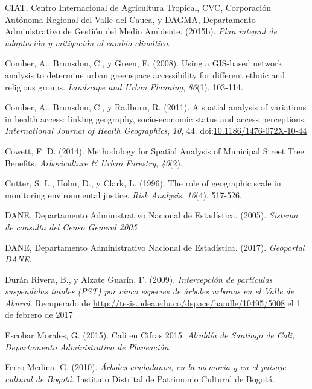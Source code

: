 \documentclass[12pt,a4paper,oneside, openany]{book}
\theoremstyle{definition}
\theoremstyle{definition}
\theoremstyle{definition}
\theoremstyle{remark}
\begin{document}
\hypertarget{ref-ciat_plan_2015}{}
CIAT, Centro Internacional de Agricultura Tropical, CVC, Corporación
Autónoma Regional del Valle del Cauca, y DAGMA, Departamento
Administrativo de Gestión del Medio Ambiente. (2015b). \emph{Plan
integral de adaptación y mitigación al cambio climático}.

\hypertarget{ref-comber_using_2008}{}
Comber, A., Brunsdon, C., y Green, E. (2008). Using a GIS-based network
analysis to determine urban greenspace accessibility for different
ethnic and religious groups. \emph{Landscape and Urban Planning},
\emph{86}(1), 103-114.

\hypertarget{ref-comber_spatial_2011}{}
Comber, A., Brunsdon, C., y Radburn, R. (2011). A spatial analysis of
variations in health access: linking geography, socio-economic status
and access perceptions. \emph{International Journal of Health
Geographics}, \emph{10}, 44.
doi:\href{https://doi.org/10.1186/1476-072X-10-44}{10.1186/1476-072X-10-44}

\hypertarget{ref-cowett_methodology_2014}{}
Cowett, F. D. (2014). Methodology for Spatial Analysis of Municipal
Street Tree Benefits. \emph{Arboriculture \& Urban Forestry},
\emph{40}(2).

\hypertarget{ref-cutter_role_1996}{}
Cutter, S. L., Holm, D., y Clark, L. (1996). The role of geographic
scale in monitoring environmental justice. \emph{Risk Analysis},
\emph{16}(4), 517-526.

\hypertarget{ref-censo_sistema_dane}{}
DANE, Departamento Administrativo Nacional de Estadística. (2005).
\emph{Sistema de consulta del Censo General 2005}.

\hypertarget{ref-geoportal_DANE}{}
DANE, Departamento Administrativo Nacional de Estadística. (2017).
\emph{Geoportal DANE}.

\hypertarget{ref-duran_rivera_intercepcion_2009}{}
Durán Rivera, B., y Alzate Guarín, F. (2009). \emph{Intercepción de
partículas suspendidas totales (PST) por cinco especies de árboles
urbanos en el Valle de Aburrá}. Recuperado de
\url{http://tesis.udea.edu.co/dspace/handle/10495/5008} el 1 de febrero
de 2017

\hypertarget{ref-escobar2015cali}{}
Escobar Morales, G. (2015). Cali en Cifras 2015. \emph{Alcaldía de
Santiago de Cali, Departamento Administrativo de Planeación}.

\hypertarget{ref-ferro_medina_arboles_2010}{}
Ferro Medina, G. (2010). \emph{Árboles ciudadanos, en la memoria y en el
paisaje cultural de Bogotá}. Instituto Distrital de Patrimonio Cultural
de Bogotá.
\end{document}
